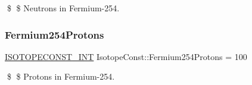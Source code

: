 \$ \$ Neutrons in Fermium-\/254. \mbox{\label{group___isotope_const-_fermium-_fm254_ga591d01e8bc2b627974a007912cb52efe}} 
\subsubsection{\texorpdfstring{Fermium254\+Protons}{Fermium254Protons}}
{\footnotesize\ttfamily \mbox{\hyperlink{group___isotope_const-_macros_ga5f18360b3e99483a35c32d789e62621c}{I\+S\+O\+T\+O\+P\+E\+C\+O\+N\+S\+T\+\_\+\+I\+NT}} Isotope\+Const\+::\+Fermium254\+Protons = 100}

\$ \$ Protons in Fermium-\/254. 
